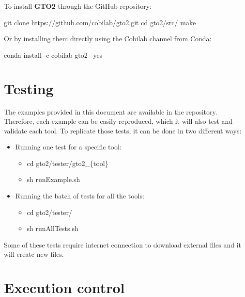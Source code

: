 \documentclass[11pt,]{krantz}
\newenvironment{Shaded}{\begin{snugshade}}{\end{snugshade}}
\newcommand{\FunctionTok}[1]{\textcolor[rgb]{0,0,0}{#1}}
\newcommand{\BuiltInTok}[1]{#1}
\newcommand{\ExtensionTok}[1]{#1}
\newcommand{\NormalTok}[1]{#1}
\providecommand{\tightlist}{%
  \setlength{\itemsep}{0pt}\setlength{\parskip}{0pt}}
\begin{document}
To install \textbf{GTO2} through the GitHub repository:

\begin{Shaded}
\begin{Highlighting}[]
\FunctionTok{git}\NormalTok{ clone https://github.com/cobilab/gto2.git}
\BuiltInTok{cd}\NormalTok{ gto2/src/}
\FunctionTok{make}
\end{Highlighting}
\end{Shaded}

Or by installing them directly using the Cobilab channel from Conda:

\begin{Shaded}
\begin{Highlighting}[]
\ExtensionTok{conda}\NormalTok{ install -c cobilab gto2 --yes}
\end{Highlighting}
\end{Shaded}

\section{Testing}\label{testing}

The examples provided in this document are available in the repository.
Therefore, each example can be easily reproduced, which it will also
test and validate each tool. To replicate those tests, it can be done in
two different ways:

\begin{itemize}
\tightlist
\item
  Running one test for a specific tool:

  \begin{itemize}
  \tightlist
  \item
    cd gto2/tester/gto2\_\{tool\}
  \item
    sh runExample.sh
  \end{itemize}
\item
  Running the batch of tests for all the tools:

  \begin{itemize}
  \tightlist
  \item
    cd gto2/tester/
  \item
    sh runAllTests.sh
  \end{itemize}
\end{itemize}

Some of these tests require internet connection to download external
files and it will create new files.

\section{Execution control}\label{execution-control}
\end{document}
